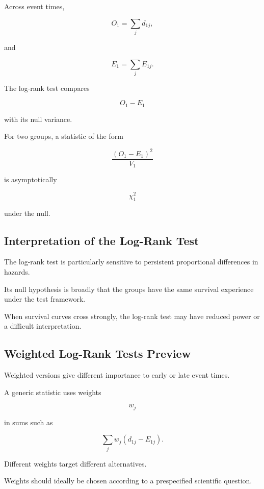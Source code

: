 Across event times,

\[
\boxed{
O_1
=
\sum_jd_{1j},
}
\]

and

\[
\boxed{
E_1
=
\sum_jE_{1j}.
}
\]

The log-rank test compares

\[
\boxed{
O_1-E_1
}
\]

with its null variance.

For two groups, a statistic of the form

\[
\boxed{
\frac{
(O_1-E_1)^2
}{
V_1
}
}
\]

is asymptotically

\[
\chi^2_1
\]

under the null.

\subsection{Interpretation of the Log-Rank Test}
\label{subsec:log-rank-interpretation}

The log-rank test is particularly sensitive to persistent proportional
differences in hazards.

Its null hypothesis is broadly that the groups have the same survival
experience under the test framework.

When survival curves cross strongly, the log-rank test may have reduced
power or a difficult interpretation.

\subsection{Weighted Log-Rank Tests Preview}
\label{subsec:weighted-log-rank}

Weighted versions give different importance to early or late event times.

A generic statistic uses weights

\[
w_j
\]

in sums such as

\[
\boxed{
\sum_j
w_j
(
d_{1j}-E_{1j}
).
}
\]

Different weights target different alternatives.

Weights should ideally be chosen according to a prespecified scientific
question.

